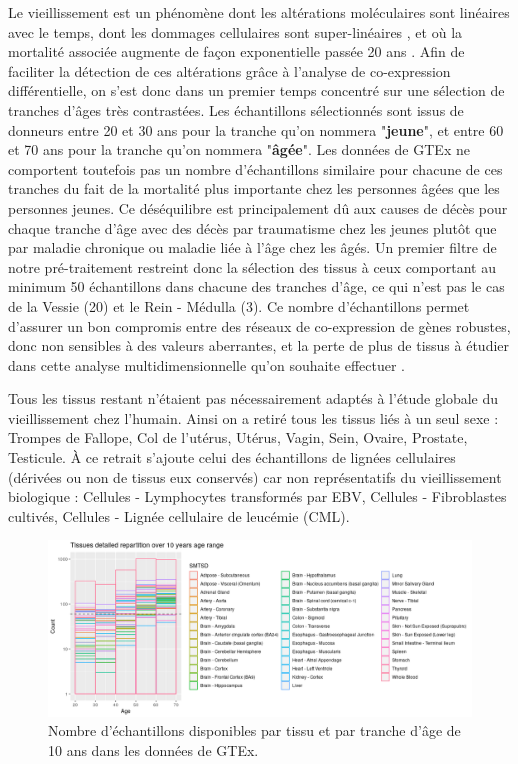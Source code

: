 Le vieillissement est un phénomène dont les altérations moléculaires sont linéaires avec le temps, dont les dommages cellulaires sont super-linéaires , et où la mortalité associée augmente de façon exponentielle passée 20 ans . Afin de faciliter la détection de ces altérations grâce à l'analyse de co-expression différentielle, on s'est donc dans un premier temps concentré sur une sélection de tranches d'âges très contrastées. Les échantillons sélectionnés sont issus de donneurs entre 20 et 30 ans pour la tranche qu'on nommera "\textbf{jeune}", et entre 60 et 70 ans pour la tranche qu'on nommera "\textbf{âgée}". Les données de GTEx ne comportent toutefois pas un nombre d'échantillons similaire pour chacune de ces tranches du fait de la mortalité plus importante chez les personnes âgées que les personnes jeunes. Ce déséquilibre est principalement dû aux causes de décès pour chaque tranche d'âge avec des décès par traumatisme chez les jeunes plutôt que par maladie chronique ou maladie liée à l'âge chez les âgés. Un premier filtre de notre pré-traitement restreint donc la sélection des tissus à ceux comportant au minimum 50 échantillons dans chacune des tranches d'âge, ce qui n'est pas le cas de la Vessie (20) et le Rein - Médulla (3). Ce nombre d'échantillons permet d'assurer un bon compromis entre des réseaux de co-expression de gènes robustes, donc non sensibles à des valeurs aberrantes, et la perte de plus de tissus à étudier dans cette analyse multidimensionnelle qu'on souhaite effectuer .

Tous les tissus restant n'étaient pas nécessairement adaptés à l'étude globale du vieillissement chez l'humain. Ainsi on a retiré tous les tissus liés à un seul sexe : Trompes de Fallope, Col de l'utérus, Utérus, Vagin, Sein, Ovaire, Prostate, Testicule. À ce retrait s'ajoute celui des échantillons de lignées cellulaires (dérivées ou non de tissus eux conservés) car non représentatifs du vieillissement biologique : Cellules - Lymphocytes transformés par EBV, Cellules - Fibroblastes cultivés, Cellules - Lignée cellulaire de leucémie (CML). 


\begin{figure}[h]
    \centering
    \includegraphics[width=1\textwidth]{img/chap2/chap2_sample_count_by_tissu.png}
    \caption{Nombre d'échantillons disponibles par tissu et par tranche d'âge de 10 ans dans les données de GTEx.}
    \label{figure:sample_count_by_tissu}
\end{figure}


